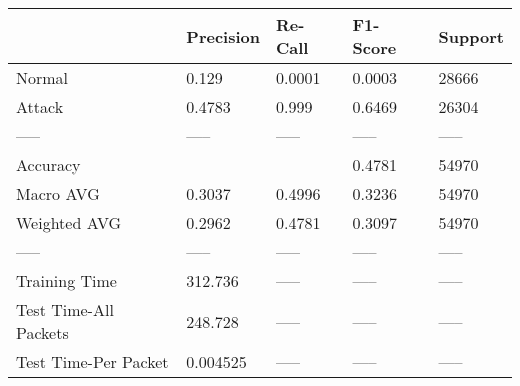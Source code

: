 \begin{tabular}{lllll}
\toprule
{} & Precision & Re-Call & F1-Score & Support \\
\midrule
Normal                &     0.129 &  0.0001 &   0.0003 &   28666 \\
Attack                &    0.4783 &   0.999 &   0.6469 &   26304 \\
-----                 &     ----- &   ----- &    ----- &   ----- \\
Accuracy              &           &         &   0.4781 &   54970 \\
Macro AVG             &    0.3037 &  0.4996 &   0.3236 &   54970 \\
Weighted AVG          &    0.2962 &  0.4781 &   0.3097 &   54970 \\
-----                 &     ----- &   ----- &    ----- &   ----- \\
Training Time         &   312.736 &   ----- &    ----- &   ----- \\
Test Time-All Packets &   248.728 &   ----- &    ----- &   ----- \\
Test Time-Per Packet  &  0.004525 &   ----- &    ----- &   ----- \\
\bottomrule
\end{tabular}
